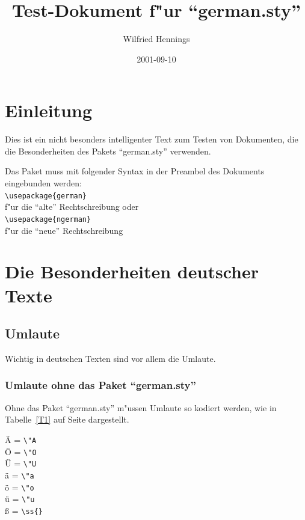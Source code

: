 ﻿\documentclass[11pt]{report} %
\title{Test-Dokument f"ur "`german.sty"'}
\author{Wilfried Hennings}
\date{2001-09-10}
\begin{document}
\maketitle

\tableofcontents

\chapter{Einleitung}
Dies ist ein nicht besonders intelligenter Text zum Testen von
Dokumenten, die die Besonderheiten des Pakets "`german.sty"' verwenden.

Das Paket muss mit folgender Syntax in der Preambel des Dokuments
eingebunden werden:\\
\verb|\usepackage{german}|\\
f"ur die "`alte"' Rechtschreibung oder \\
\verb|\usepackage{ngerman}|\\
f"ur die "`neue"' Rechtschreibung 


\chapter{Die Besonderheiten deutscher Texte}
\section{Umlaute}

Wichtig in deutschen Texten sind vor allem die Umlaute.

\subsection{Umlaute ohne das Paket "`german.sty"'}
Ohne das Paket "`german.sty"' m"ussen Umlaute so kodiert werden, wie in
Tabelle~\ref{T1} auf Seite \pageref{T1} dargestellt.
\begin{table}[ht]
\"A = \verb|\"A|\\
\"O = \verb|\"O|\\
\"U = \verb|\"U|\\
\"a = \verb|\"a|\\
\"o = \verb|\"o|\\
\"u = \verb|\"u|\\
\ss{} = \verb|\ss{}|
\caption{Tabelle der Umlaute in Standard-LaTeX} 
\label{T1}
\end{table}
\end{document}
